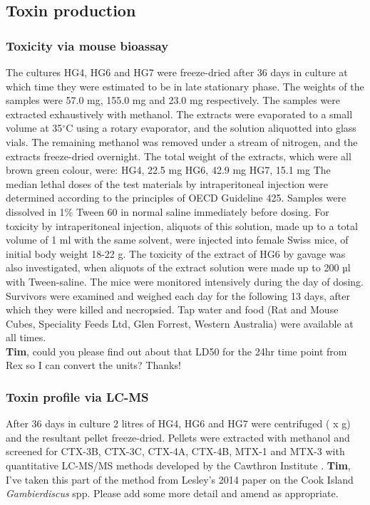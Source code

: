 \documentclass[12pt]{article}
\begin{document}
\subsection{Toxin production}

\subsubsection{Toxicity via mouse bioassay}
The cultures HG4, HG6 and HG7 were freeze-dried after 36 days in culture at which time they were estimated to be in late stationary phase. The weights of the samples were 57.0 mg, 155.0 mg and 23.0 mg respectively. The samples were extracted exhaustively with methanol. The extracts were evaporated to a small volume at 35$^{\circ}$C using a rotary evaporator, and the solution aliquotted into glass vials. The remaining methanol was removed under a stream of nitrogen, and the extracts freeze-dried overnight. The total weight of the extracts, which were all brown green colour, were: HG4, 22.5 mg HG6, 42.9 mg HG7, 15.1 mg The median lethal doses of the test materials by intraperitoneal injection were determined according to the principles of OECD Guideline 425. Samples were dissolved in 1\% Tween 60 in normal saline immediately before dosing. For toxicity by intraperitoneal injection, aliquots of this solution, made up to a total volume of 1 ml with the same solvent, were injected into female Swiss mice, of initial body weight 18-22 g. The toxicity of the extract of HG6 by gavage was also investigated, when aliquots of the extract solution were made up to 200 µl with Tween-saline. The mice were monitored intensively during the day of dosing. Survivors were examined and weighed each day for the following 13 days, after which they were killed and necropsied. Tap water and food (Rat and Mouse Cubes, Speciality Feeds Ltd, Glen Forrest, Western Australia) were available at all times.\\
\textbf{Tim}, could you please find out about that LD50 for the 24hr time point from Rex so I can convert the units? Thanks!

\subsubsection{Toxin profile via LC-MS}
After 36 days in culture 2 litres of HG4, HG6 and HG7 were centrifuged (  x g) and the resultant pellet freeze-dried. Pellets were extracted with methanol and screened for CTX-3B, CTX-3C, CTX-4A, CTX-4B, MTX-1 and MTX-3 with quantitative LC-MS/MS methods developed by the Cawthron Institute \citep{kohli2014feeding}.
\textbf{Tim}, I've taken this part of the method from Lesley's 2014 paper on the Cook Island \emph{Gambierdiscus} spp. Please add some more detail and amend as appropriate. 
\end{document}
